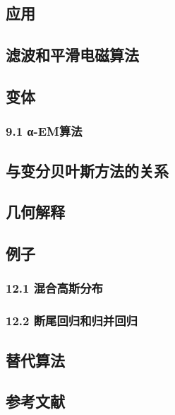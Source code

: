 \subsection{应用}



\subsection{滤波和平滑电磁算法}



\subsection{变体}



\subsubsection{9.1 α-EM算法}



\subsection{与变分贝叶斯方法的关系}



\subsection{几何解释}



\subsection{例子}

\subsubsection{12.1 混合高斯分布}



\subsubsection{12.2 断尾回归和归并回归}



\subsection{替代算法}



\subsection{参考文献}
